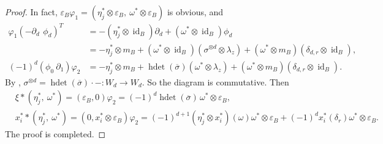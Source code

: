 \documentclass[a4paper,10pt]{amsart}
\theoremstyle{definition}
\numberwithin{equation}{section}
\DeclareMathOperator{\id}{id}
\DeclareMathOperator{\hdet}{hdet}
\begin{document}
\begin{proof}
In fact, $\varepsilon_B\varphi_1=(\eta_j^*\otimes\varepsilon_B,\  \omega^*\otimes\varepsilon_B)$ is obvious, and
\begin{align*}
\varphi_1(-\partial_d\ \, \phi_d)^T&=-(\eta_j^*\otimes\id_B)\partial_d+(\omega^*\otimes\id_B)\phi_d\\
&=-\eta_j^*\otimes m_B+(\omega^*\otimes\id_B)(\sigma^{\otimes d}\otimes \lambda_z)+(\omega^*\otimes m_B)(\delta_{d,r}\otimes \id_B),\\
(-1)^d(\phi_0\ \partial_1)\varphi_2&=-\eta_j^*\otimes m_B+\hdet(\overline{\sigma})(\omega^*\otimes\lambda_z)+(\omega^*\otimes m_B)(\delta_{d,r}\otimes \id_B).
\end{align*}
By \cite[Theorem 1.2]{MS}, $\sigma^{\otimes d}=\hdet(\overline{\sigma})\cdot-:W_d\to W_d$. So the diagram is commutative. Then \begin{align*}
&\xi\ast(\eta_j^*,\  \omega^*)=(\varepsilon_B,0)\varphi_2=(-1)^d\hdet(\overline{\sigma})\,\omega^*\otimes\varepsilon_B,\\
&x^*_i\ast(\eta_j^*,\  \omega^*)=(0,x^*_i\otimes \varepsilon_B)\varphi_2=(-1)^{d+1}(\eta_j^*\otimes x^*_i)(\omega)\omega^*\otimes\varepsilon_B+(-1)^dx_i^*({\delta_r})\omega^*\otimes\varepsilon_B.
\end{align*}
The proof is completed.
\end{proof}
\end{document}
